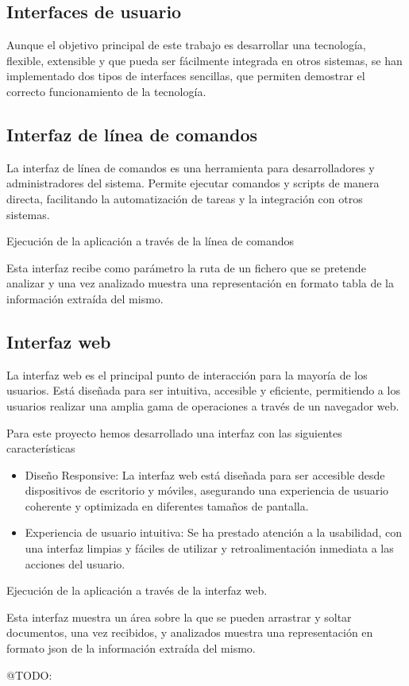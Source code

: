 \subsection*{Interfaces de usuario}
Aunque el objetivo principal de este trabajo es desarrollar una tecnología, flexible, extensible y que pueda ser
fácilmente integrada en otros sistemas, se han implementado dos tipos de interfaces sencillas, que permiten demostrar el
correcto funcionamiento de la tecnología.

\subsection*{Interfaz de línea de comandos}
La interfaz de línea de comandos es una herramienta para desarrolladores y administradores del sistema. Permite ejecutar
comandos y scripts de manera directa, facilitando la automatización de tareas y la integración con otros sistemas.


Ejecución de la aplicación a través de la línea de comandos

Esta interfaz recibe como parámetro la ruta de un fichero que se pretende analizar y una vez analizado muestra una
representación en formato tabla de la información extraída del mismo.

\subsection*{Interfaz web}
La interfaz web es el principal punto de interacción para la mayoría de los usuarios. Está diseñada para ser intuitiva,
accesible y eficiente, permitiendo a los usuarios realizar una amplia gama de operaciones a través de un navegador web.

Para este proyecto hemos desarrollado una interfaz con las siguientes características

\begin{itemize}
    \item
    Diseño Responsive: La interfaz web está diseñada para ser accesible desde dispositivos de escritorio y móviles,
    asegurando una experiencia de usuario coherente y optimizada en diferentes tamaños de pantalla.
    \item
    Experiencia de usuario intuitiva: Se ha prestado atención a la usabilidad, con una interfaz limpias y fáciles de
    utilizar y retroalimentación inmediata a las acciones del usuario.
\end{itemize}


Ejecución de la aplicación a través de la interfaz web.

Esta interfaz muestra un área sobre la que se pueden arrastrar y soltar documentos, una vez recibidos, y analizados
muestra una representación en formato json de la información extraída del mismo.

\colorbox{color_highlight} {@TODO: }
